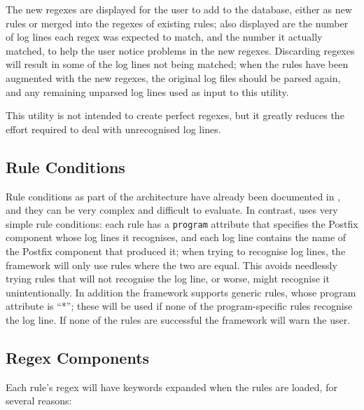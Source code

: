 The new regexes are displayed for the user to add to the database, either
as new rules or merged into the regexes of existing rules; also displayed
are the number of log lines each regex was expected to match, and the
number it actually matched, to help the user notice problems in the new
regexes.  Discarding regexes will result in some of the log lines not being
matched; when the rules have been augmented with the new regexes, the
original log files should be parsed again, and any remaining unparsed log
lines used as input to this utility.

This utility is not intended to create perfect regexes, but it greatly
reduces the effort required to deal with unrecognised log lines.

\subsection{Rule Conditions}

\label{rule conditions in implementation}

Rule conditions as part of the architecture have already been documented in
, and they can be very complex
and difficult to evaluate.  In contrast, \parsername{} uses very simple
rule conditions: each rule has a \texttt{program} attribute that specifies
the Postfix component whose log lines it recognises, and each log line
contains the name of the Postfix component that produced it; when trying to
recognise log lines, the framework will only use rules where the two are
equal.  This avoids needlessly trying rules that will not recognise the log
line, or worse, might recognise it unintentionally.  In addition the
framework supports generic rules, whose program attribute is ``*''; these
will be used if none of the program-specific rules recognise the log line.
If none of the rules are successful the framework will warn the user.

\subsection{Regex Components}

\label{regex components}

Each rule's regex will have keywords expanded when the rules are loaded,
for several reasons:

